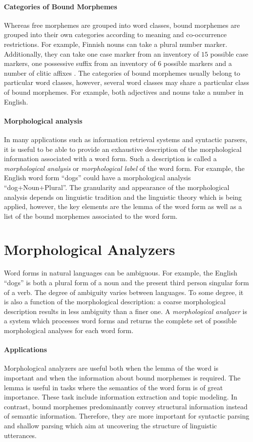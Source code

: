 \paragraph{Categories of Bound Morphemes} Whereas free morphemes are
grouped into word classes, bound morphemes are grouped into their own
categories according to meaning and co-occurrence restrictions. For
example, Finnish nouns can take a plural number
marker. Additionally, they can take one case marker from an inventory
of $15$ possible case markers, one possessive suffix from an inventory
of $6$ possible markers and a number of clitic affixes
\citep{Hakulinen2004}. The categories of bound morphemes usually
belong to particular word classes, however, several word classes may
share a particular class of bound morphemes. For example, both
adjectives and nouns take a number in English.

\paragraph{Morphological analysis} In many applications such as
information retrieval systems and syntactic par\-sers, it is useful to
be able to provide an exhaustive description of the morphological
information associated with a word form. Such a description is called
a {\it morphological analysis} or {\it morphological label} of the word
form. For example, the English word form ``dogs'' could have a
morphological analysis ``dog+Noun+Plural''. The granularity and
appearance of the morphological analysis depends on linguistic
tradition and the linguistic theory which is being applied, however,
the key elements are the lemma of the word form as well as a list of
the bound morphemes associated to the word form.

\section{Morphological Analyzers}
Word forms in natural languages can be ambiguous. For example, the
English ``dogs'' is both a plural form of a noun and the present third
person singular form of a verb. The degree of ambiguity varies between
languages. To some degree, it is also a function of the morphological
description: a coarse morphological description results in less
ambiguity than a finer one. A {\it morphological analyzer} is a system
which processes word forms and returns the complete set of possible
morphological analyses for each word form.

\paragraph{Applications} Morphological analyzers are useful both when
the lemma of the word is important and when the information about
bound morphemes is required. The lemma is useful in tasks where the
semantics of the word form is of great importance. These task include
information extraction and topic modeling. In contrast, bound
morphemes predominantly convey structural information instead of semantic
information. Therefore, they are more important for syntactic parsing and
shallow parsing which aim at uncovering the structure of linguistic
utterances.

